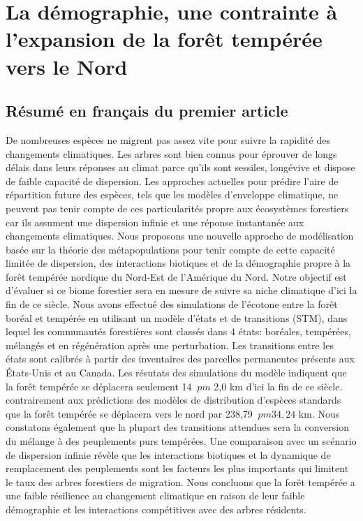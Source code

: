 
\chapter{La démographie, une contrainte à l'expansion de la forêt tempérée vers le Nord}

\section{Résumé en français du premier article}

De nombreuses espèces ne migrent pas assez vite pour suivre la rapidité des changements climatiques.  Les arbres sont bien connus pour éprouver de longs délais dans leurs réponses au climat parce qu'ils sont sessiles, longévive et dispose de faible capacité de dispersion. Les approches actuelles pour  prédire l'aire de répartition future des espèces, tels que les modèles d'enveloppe climatique, ne peuvent pas tenir compte de ces particularités propre aux écosystèmes forestiers car ils assument une dispersion infinie et une réponse instantanée aux changements climatiques. Nous proposons une nouvelle approche de modélisation basée sur la théorie des métapopulations pour tenir compte de cette capacité limitée de dispersion, des interactions biotiques et de la démographie propre à la forêt tempérée nordique du Nord-Est de l'Amérique du Nord. Notre objectif est d'évaluer si ce biome forestier sera en mesure de suivre sa niche climatique d'ici la fin de ce siècle. Nous avons effectué des simulations de l'écotone entre la forêt boréal et tempérée en utilisant un modèle d'états et de transitions (STM), dans lequel les communautés forestières sont classés dans 4 états: boréales, tempérées, mélangés et en régénération après une perturbation. Les transitions entre les états sont calibrés à partir des inventaires des parcelles permanentes présents aux États-Unis et au Canada. Les résutats des simulations du modèle indiquent que la forêt tempérée se déplacera seulement 14 $ \ pm $ 2,0 km d'ici la fin de ce siècle. contrairement aux prédictions des modèles de distribution d'espèces standards que la forêt tempérée se déplacera vers le nord par 238,79 $ \ pm 34,24 $ km. Nous constatons également que la plupart des transitions attendues sera la conversion du mélange à des peuplements purs tempérées. Une comparaison avec un scénario de dispersion infinie révèle que les interactions biotiques et la dynamique de remplacement des peuplements sont les facteurs les plus importants qui limitent le taux des arbres forestiers de migration. Nous concluons que la forêt tempérée a une faible résilience au changement climatique en raison de leur faible démographie et les interactions compétitives avec des arbres résidents.

